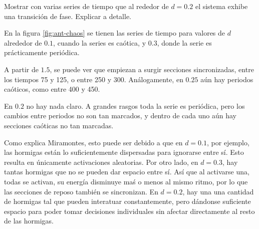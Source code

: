 \documentclass{article}
\begin{document}
Mostrar con varias series de tiempo que al rededor de $d=0.2$ el sistema exhibe
una transición de fase. Explicar a detalle.

En la figura \ref{fig:ant-chaos} se tienen las series de tiempo para valores de
$d$ alrededor de $0.1$, cuando la series es caótica, y $0.3$, donde la serie es
prácticamente periódica.

A partir de $1.5$, se puede ver que empiezan a surgir secciones sincronizadas,
entre los tiempos 75 y 125, o entre 250 y 300. Análogamente, en $0.25$ aún hay
periodos caóticos, como entre 400 y 450.

En $0.2$ no hay nada claro. A grandes rasgos toda la serie es periódica, pero
los cambios entre periodos no son tan marcados, y dentro de cada uno aún hay
secciones caóticas no tan marcadas.

Como explica Miramontes, esto puede ser debido a que en $d=0.1$, por ejemplo,
las hormigas están lo suficientemente dispersadas para ignorarse entre sí. Esto
resulta en únicamente activaciones aleatorias. Por otro lado, en $d=0.3$, hay
tantas hormigas que no se pueden dar espacio entre sí. Así que al activarse
una, todas se activan, su energía disminuye maś o menos al mismo ritmo, por lo
que las secciones de reposo también se sincronizan. En $d=0.2$, hay una una
cantidad de hormigas tal que pueden interatuar constantemente, pero dándonse
suficiente espacio para poder tomar decisiones individuales sin afectar
directamente al resto de las hormigas.
\end{document}
